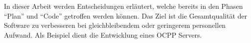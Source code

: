 
In dieser Arbeit werden Entscheidungen erläutert, 
welche bereits in den Phasen ``Plan'' und ``Code'' getroffen werden können.
Das Ziel ist die Gesamtqualität der Software zu verbesseren bei 
gleichbleibendem oder geringerem personellen Aufwand. Als Beispiel dient die Entwicklung eines OCPP Servers.